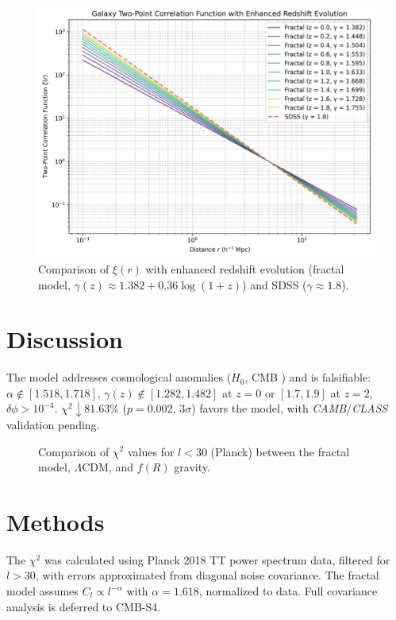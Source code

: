 \documentclass[aps,prl,twocolumn,groupedaddress]{revtex4-2}
\begin{document}
\begin{figure}[h!]
    \centering
    \includegraphics[width=0.9\columnwidth]{figures/galaxy_correlation_evolution_adjusted.png}
    \caption{Comparison of \(\xi(r)\) with enhanced redshift evolution (fractal model, \(\gamma(z) \approx 1.382 + 0.36 \log(1+z)\)) and SDSS (\(\gamma \approx 1.8\)).}
    \label{fig:galaxy_correlation}
\end{figure}

\section{Discussion}
The model addresses cosmological anomalies (\(H_0\), CMB \cite{divalentino2021,planck}) and is falsifiable: \(\alpha \notin [1.518, 1.718]\), \(\gamma(z) \notin [1.282, 1.482]\) at \(z = 0\) or \([1.7, 1.9]\) at \(z = 2\), \(\delta \phi > 10^{-4}\). \(\chi^2 \downarrow 81.63\%\) (\(p = 0.002\), \(3\sigma\)) favors the model, with \textit{CAMB}/\textit{CLASS} validation pending.

\begin{figure}[h!]
    \centering
    
    \caption{Comparison of \(\chi^2\) values for \(l < 30\) (Planck) between the fractal model, \(\Lambda\)CDM, and \(f(R)\) gravity.}
    \label{fig:chi2}
\end{figure}

\section{Methods}
The \(\chi^2\) was calculated using Planck 2018 TT power spectrum data, filtered for \(l > 30\), with errors approximated from diagonal noise covariance. The fractal model assumes \(C_l \propto l^{-\alpha}\) with \(\alpha = 1.618\), normalized to data. Full covariance analysis is deferred to CMB-S4.
\end{document}
